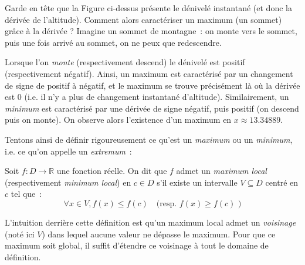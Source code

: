 Garde en tête que la Figure ci-dessus présente le dénivelé instantané (et donc la dérivée de l'altitude). Comment alors caractériser un maximum (un sommet) grâce à la dérivée ? Imagine un sommet de montagne~: on monte vers le sommet, puis une fois arrivé au sommet, on ne peux que redescendre. 

Lorsque l'on \emph{monte} (respectivement descend) le dénivelé est positif (respectivement négatif). Ainsi, un maximum est caractérisé par un changement de signe de positif à négatif, et le maximum se trouve précisément là où la dérivée est 0 (i.e. il n'y a plus de changement instantané d'altitude). Similairement, un \emph{minimum} est caractérisé par une dérivée de signe négatif, puis positif (on descend puis on monte). On observe alors l'existence d'un maximum en $x \approx 13.34889$.

Tentons ainsi de définir rigoureusement ce qu'est un \emph{maximum} ou un \emph{minimum}, i.e. ce qu'on appelle un \emph{extremum}~:

\begin{boxdef}[Extremum]
Soit $f : D \to \mathbb{R}$ une fonction réelle. On dit que $f$ admet un \emph{maximum local} (respectivement \emph{minimum local}) en $c \in D$ s'il existe un intervalle $V \subseteq D$ centré en $c$ tel que~:
\begin{equation}
    \forall x \in V, f(x) \leq f(c) \quad \text{(resp. } f(x) \geq f(c) \text{ )}
\end{equation}
\end{boxdef}

L'intuition derrière cette définition est qu'un maximum local admet un \emph{voisinage} (noté ici $V$) dans lequel aucune valeur ne dépasse le maximum. Pour que ce maximum soit global, il suffit d'étendre ce voisinage à tout le domaine de définition.

